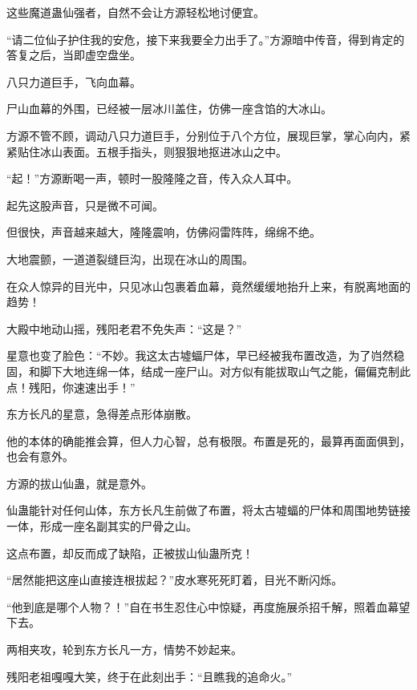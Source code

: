 \begin{this_body}
这些魔道蛊仙强者，自然不会让方源轻松地讨便宜。

“请二位仙子护住我的安危，接下来我要全力出手了。”方源暗中传音，得到肯定的答复之后，当即虚空盘坐。

八只力道巨手，飞向血幕。

尸山血幕的外围，已经被一层冰川盖住，仿佛一座含馅的大冰山。

方源不管不顾，调动八只力道巨手，分别位于八个方位，展现巨掌，掌心向内，紧紧贴住冰山表面。五根手指头，则狠狠地抠进冰山之中。

“起！”方源断喝一声，顿时一股隆隆之音，传入众人耳中。

起先这股声音，只是微不可闻。

但很快，声音越来越大，隆隆震响，仿佛闷雷阵阵，绵绵不绝。

大地震颤，一道道裂缝巨沟，出现在冰山的周围。

在众人惊异的目光中，只见冰山包裹着血幕，竟然缓缓地抬升上来，有脱离地面的趋势！

大殿中地动山摇，残阳老君不免失声：“这是？”

星意也变了脸色：“不妙。我这太古墟蝠尸体，早已经被我布置改造，为了岿然稳固，和脚下大地连绵一体，结成一座尸山。对方似有能拔取山气之能，偏偏克制此点！残阳，你速速出手！”

东方长凡的星意，急得差点形体崩散。

他的本体的确能推会算，但人力心智，总有极限。布置是死的，最算再面面俱到，也会有意外。

方源的拔山仙蛊，就是意外。

仙蛊能针对任何山体，东方长凡生前做了布置，将太古墟蝠的尸体和周围地势链接一体，形成一座名副其实的尸骨之山。

这点布置，却反而成了缺陷，正被拔山仙蛊所克！

“居然能把这座山直接连根拔起？”皮水寒死死盯着，目光不断闪烁。

“他到底是哪个人物？！”自在书生忍住心中惊疑，再度施展杀招千解，照着血幕望下去。

两相夹攻，轮到东方长凡一方，情势不妙起来。

残阳老祖嘎嘎大笑，终于在此刻出手：“且瞧我的追命火。”

\end{this_body}

